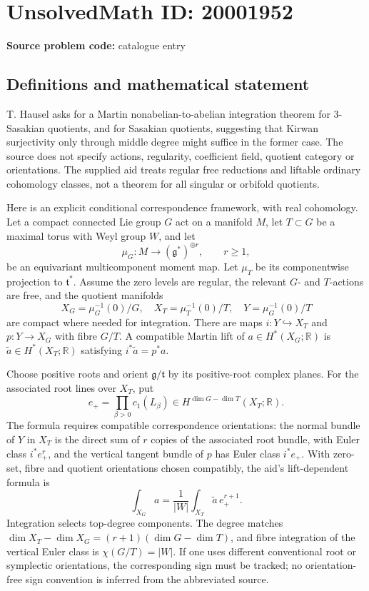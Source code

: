 \documentclass[11pt]{article}
\newcommand{\R}{\mathbb{R}}
\begin{document}
\section*{UnsolvedMath ID: 20001952}
\textbf{Source problem code:} catalogue entry
\subsection{Definitions and mathematical statement}
T. Hausel asks for a Martin nonabelian-to-abelian integration theorem for 3-Sasakian quotients, and for Sasakian quotients, suggesting that Kirwan surjectivity only through middle degree might suffice in the former case. The source does not specify actions, regularity, coefficient field, quotient category or orientations. The supplied aid treats regular free reductions and liftable ordinary cohomology classes, not a theorem for all singular or orbifold quotients.

Here is an explicit conditional correspondence framework, with real cohomology. Let a compact connected Lie group \(G\) act on a manifold \(M\), let \(T\subset G\) be a maximal torus with Weyl group \(W\), and let
\[
 \mu_G:M\to(\mathfrak g^*)^{\oplus r},\qquad r\geq1,
\]
be an equivariant multicomponent moment map. Let \(\mu_T\) be its componentwise projection to \(\mathfrak t^*\). Assume the zero levels are regular, the relevant \(G\)- and \(T\)-actions are free, and the quotient manifolds
\[
 X_G=\mu_G^{-1}(0)/G,\quad X_T=\mu_T^{-1}(0)/T,\quad
 Y=\mu_G^{-1}(0)/T
\]
are compact where needed for integration. There are maps
\(i:Y\hookrightarrow X_T\) and \(p:Y\to X_G\) with fibre \(G/T\). A compatible Martin lift of \(a\in H^*(X_G;\R)\) is \(\widetilde a\in H^*(X_T;\R)\) satisfying \(i^*\widetilde a=p^*a\).

Choose positive roots and orient \(\mathfrak g/\mathfrak t\) by its positive-root complex planes. For the associated root lines over \(X_T\), put
\[
 e_+=\prod_{\beta>0}c_1(L_\beta)
 \in H^{\dim G-\dim T}(X_T;\R).
\]
The formula requires compatible correspondence orientations: the normal bundle of \(Y\) in \(X_T\) is the direct sum of \(r\) copies of the associated root bundle, with Euler class \(i^*e_+^r\), and the vertical tangent bundle of \(p\) has Euler class \(i^*e_+\). With zero-set, fibre and quotient orientations chosen compatibly, the aid's lift-dependent formula is
\[
 \int_{X_G}a=\frac1{|W|}\int_{X_T}\widetilde a\,e_+^{r+1}.
\]
Integration selects top-degree components. The degree matches
\(\dim X_T-\dim X_G=(r+1)(\dim G-\dim T)\), and fibre integration of the vertical Euler class is \(\chi(G/T)=|W|\). If one uses different conventional root or symplectic orientations, the corresponding sign must be tracked; no orientation-free sign convention is inferred from the abbreviated source.
\end{document}
